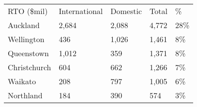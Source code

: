 \begin{tabular}[t]{p{2.3cm}p{1.2cm}p{1cm}p{0.9cm}p{1.2cm}}
 RTO (\$mil) & International & Domestic & Total & \% \\ 
 Auckland & 2,684 & 2,088 & 4,772 & 28\% \\ 
  Wellington &   436 & 1,026 & 1,461 & 8\% \\ 
  Queenstown & 1,012 &   359 & 1,371 & 8\% \\ 
  Christchurch &   604 &   662 & 1,266 & 7\% \\ 
  Waikato &   208 &   797 & 1,005 & 6\% \\ 
  Northland &   184 &   390 &   574 & 3\% \\ 
  \end{tabular}
